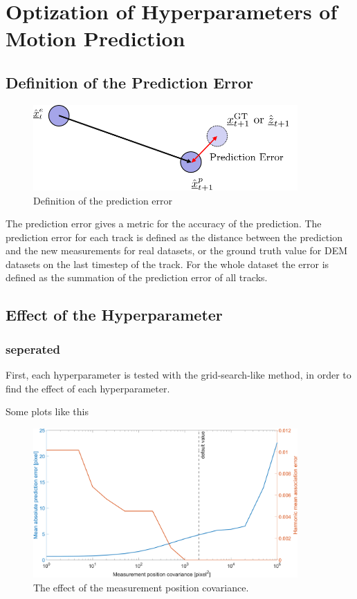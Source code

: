 \chapter{Optization of Hyperparameters of Motion Prediction}

\section{Definition of the Prediction Error}

\begin{figure}[htbp]
\centering
\includegraphics[width=0.9\textwidth]{figures/KF/prediction error.png}
\caption{Definition of the prediction error}
\label{prediction error}
\end{figure}

The prediction error gives a metric for the accuracy of the prediction. The prediction error for each track is defined as the distance between the prediction and the new measurements for real datasets, or the ground truth value for DEM datasets on the last timestep of the track. For the whole dataset the error is defined as the summation of the prediction error of all tracks. 


\section{Effect of the Hyperparameter}

\subsection{seperated}

First, each hyperparameter is tested with the grid-search-like method, in order to find the effect of each hyperparameter.

Some plots like this

\begin{figure}[htbp]
\centering
\includegraphics[width=0.9\textwidth]{figures/KF/meacov.png}
\caption{The effect of the measurement position covariance.}
\label{meacov}
\end{figure}

